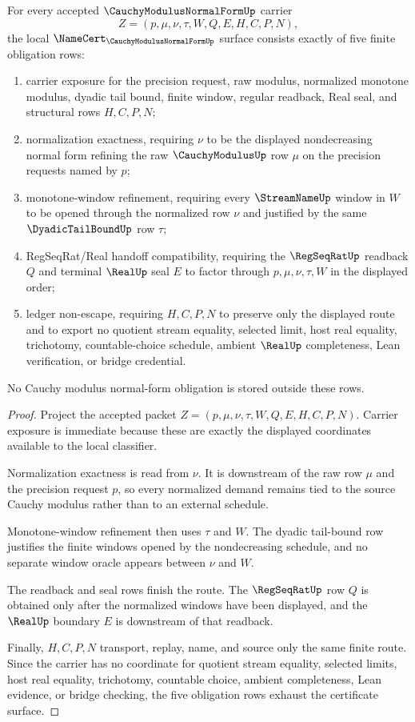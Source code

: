 \begin{theorem}
\label{thm:cauchy-modulus-normal-form-namecert-obligations}
For every accepted $\CauchyModulusNormalFormUp$ carrier
$$
Z=(p,\mu,\nu,\tau,W,Q,E,H,C,P,N),
$$
the local $\NameCert_{\CauchyModulusNormalFormUp}$ surface consists exactly of five finite obligation rows:
\begin{enumerate}
\item carrier exposure for the precision request, raw modulus, normalized monotone modulus, dyadic tail bound, finite window, regular readback, Real seal, and structural rows $H,C,P,N$;
\item normalization exactness, requiring $\nu$ to be the displayed nondecreasing normal form refining the raw $\CauchyModulusUp$ row $\mu$ on the precision requests named by $p$;
\item monotone-window refinement, requiring every $\StreamNameUp$ window in $W$ to be opened through the normalized row $\nu$ and justified by the same $\DyadicTailBoundUp$ row $\tau$;
\item RegSeqRat/Real handoff compatibility, requiring the $\RegSeqRatUp$ readback $Q$ and terminal $\RealUp$ seal $E$ to factor through $p,\mu,\nu,\tau,W$ in the displayed order;
\item ledger non-escape, requiring $H,C,P,N$ to preserve only the displayed route and to export no quotient stream equality, selected limit, host real equality, trichotomy, countable-choice schedule, ambient $\RealUp$ completeness, Lean verification, or bridge credential.
\end{enumerate}
No Cauchy modulus normal-form obligation is stored outside these rows.
\end{theorem}
\begin{proof}
Project the accepted packet $Z=(p,\mu,\nu,\tau,W,Q,E,H,C,P,N)$. Carrier exposure is immediate because these are exactly the displayed coordinates available to the local classifier.

Normalization exactness is read from $\nu$. It is downstream of the raw row $\mu$ and the precision request $p$, so every normalized demand remains tied to the source Cauchy modulus rather than to an external schedule.

Monotone-window refinement then uses $\tau$ and $W$. The dyadic tail-bound row justifies the finite windows opened by the nondecreasing schedule, and no separate window oracle appears between $\nu$ and $W$.

The readback and seal rows finish the route. The $\RegSeqRatUp$ row $Q$ is obtained only after the normalized windows have been displayed, and the $\RealUp$ boundary $E$ is downstream of that readback.

Finally, $H,C,P,N$ transport, replay, name, and source only the same finite route. Since the carrier has no coordinate for quotient stream equality, selected limits, host real equality, trichotomy, countable choice, ambient completeness, Lean evidence, or bridge checking, the five obligation rows exhaust the certificate surface.
\end{proof}

